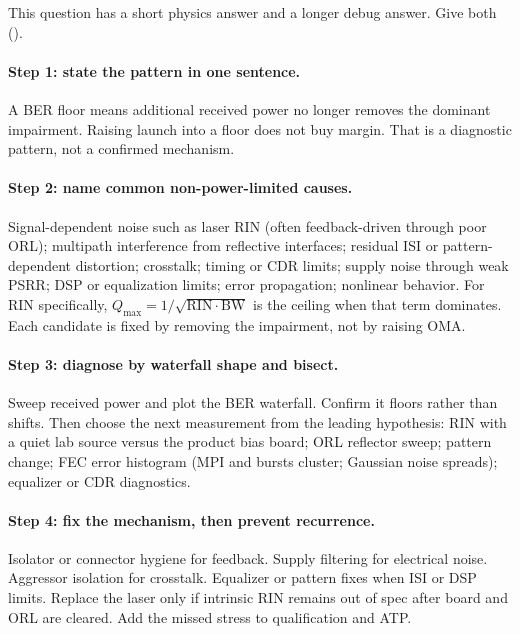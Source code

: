 This question has a short physics answer and a longer debug answer. Give both
().

\paragraph{Step 1: state the pattern in one sentence.}
A BER floor means additional received power no longer removes the dominant
impairment. Raising launch into a floor does not buy margin. That is a
diagnostic pattern, not a confirmed mechanism.

\paragraph{Step 2: name common non-power-limited causes.}
Signal-dependent noise such as laser RIN (often
feedback-driven through poor ORL); multipath interference from
reflective interfaces; residual ISI or pattern-dependent distortion;
crosstalk; timing or CDR limits; supply noise through weak
PSRR; DSP or equalization limits; error propagation;
nonlinear behavior. For RIN specifically,
$Q_{\max}=1/\sqrt{\mathrm{RIN}\cdot\mathrm{BW}}$ is the ceiling when that
term dominates. Each candidate is fixed by removing the impairment, not by
raising OMA.

\paragraph{Step 3: diagnose by waterfall shape and bisect.}
Sweep received power and plot the BER waterfall. Confirm it floors rather
than shifts. Then choose the next measurement from the leading hypothesis:
RIN with a quiet lab source versus the product bias board; ORL reflector
sweep; pattern change; FEC error histogram (MPI and bursts
cluster; Gaussian noise spreads); equalizer or CDR diagnostics.

\paragraph{Step 4: fix the mechanism, then prevent recurrence.}
Isolator or connector hygiene for feedback. Supply filtering for electrical
noise. Aggressor isolation for crosstalk. Equalizer or pattern fixes when
ISI or DSP limits. Replace the laser only if intrinsic RIN remains out of
spec after board and ORL are cleared. Add the missed stress to qualification
and ATP.


